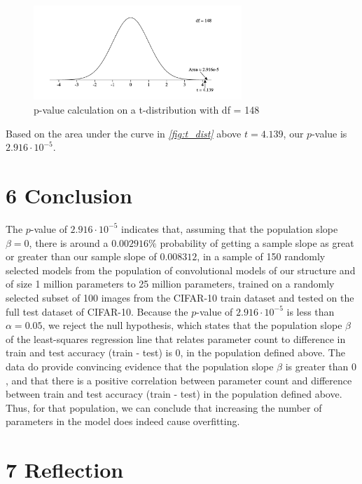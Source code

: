 \documentclass[12pt]{article}
\begin{document}
    \begin{figure}[H]
        \centering
        \includegraphics[width=0.7\textwidth]{Images/tdistribution}
        \caption{p-value calculation on a t-distribution with df = 148}
        \label{fig:t_dist}
    \end{figure}

    \noindent Based on the area under the curve in \textit{\autoref{fig:t_dist}} above $t=4.139$, our $p$-value is $2.916\cdot10^{-5}$.

    \section*{6 Conclusion}

    The $p$-value of $2.916\cdot10^{-5}$ indicates that, assuming that the population slope $\beta=0$, there is around a
    $0.002916\%$ probability of getting a sample slope as great or greater than our sample slope of $0.008312$, in a sample of
    150 randomly selected models from the population of convolutional models of our structure and of size 1 million parameters to 25 million parameters, trained
    on a randomly selected subset of 100 images from the CIFAR-10 train dataset and tested on the full test dataset of CIFAR-10.
    Because the $p$-value of $2.916\cdot10^{-5}$ is less than $\alpha=0.05$, we reject the null hypothesis, which states that the population slope $\beta$
    of the least-squares regression line that relates parameter count to difference in train and test accuracy (train - test) is $0$,
    in the population defined above.
    The data do provide convincing evidence that the population slope $\beta$ is greater than $0$, and that there is a positive correlation between
    parameter count and difference between train and test accuracy (train - test) in the population defined above. Thus, for that population, we can conclude that
    increasing the number of parameters in the model does indeed cause overfitting.


    \section*{7 Reflection}
\end{document}
